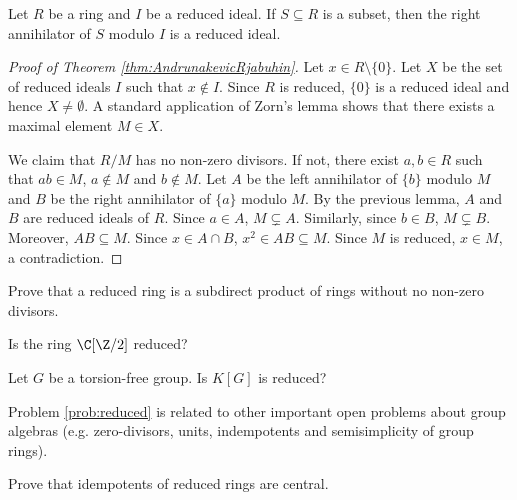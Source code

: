 \begin{exercise}
    Let $R$ be a ring and $I$ be a reduced ideal. 
    If $S\subseteq R$ is a subset, then 
    the right annihilator of $S$ modulo $I$ 
    is a reduced ideal. 
\end{exercise}

\begin{proof}[Proof of Theorem \ref{thm:AndrunakevicRjabuhin}]
    Let $x\in R\setminus\{0\}$. Let $X$ 
    be the set of reduced ideals $I$ such that 
    $x\not\in I$. Since $R$ is reduced, $\{0\}$ 
    is a reduced ideal and hence $X\ne\emptyset$. 
    A standard application of Zorn's lemma shows that
    there exists a maximal element $M\in X$. 
    
    We claim that $R/M$ has no non-zero divisors. If not, 
    there exist $a,b\in R$ such that $ab\in M$, $a\not\in M$ 
    and $b\not\in M$. Let $A$ be the left annihilator of $\{b\}$ 
    modulo $M$ and $B$ be the right annihilator of $\{a\}$ 
    modulo $M$. By the previous lemma, $A$ and $B$ 
    are reduced ideals of $R$. Since  
    $a\in A$, $M\subsetneq A$. Similarly, since 
    $b\in B$, $M\subsetneq B$. Moreover, $AB\subseteq M$. 
    Since $x\in A\cap B$, $x^2\in AB\subseteq M$. Since 
    $M$ is reduced, $x\in M$, a contradiction. 
\end{proof}

\begin{exercise}
    Prove that a reduced ring is a subdirect product
    of rings without no non-zero divisors. 
\end{exercise}

\begin{exercise}
    Is the ring $\C[\Z/2]$ reduced? 
\end{exercise}


\begin{problem}
\label{prob:reduced}
    Let $G$ be a torsion-free group. Is
    $K[G]$ is reduced?
\end{problem}

Problem \ref{prob:reduced} is related to other important
open problems about group algebras 
(e.g. zero-divisors, units, 
indempotents and semisimplicity of group
rings).

\begin{exercise}
\label{xca:reduced_central}
    Prove that idempotents of reduced rings are central. 
\end{exercise}

